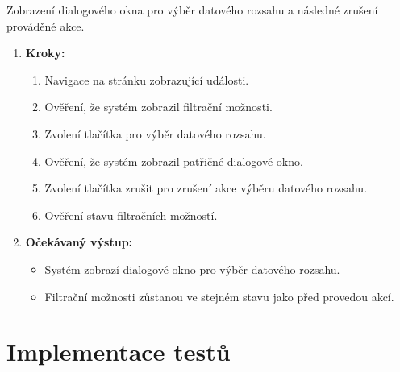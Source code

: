 Zobrazení dialogového okna pro výběr datového rozsahu a následné zrušení prováděné akce.

\begin{enumerate}
  \item \textbf{Kroky:}
    \begin{enumerate}
      \item Navigace na stránku zobrazující události.
      \item Ověření, že systém zobrazil filtrační možnosti.
      \item Zvolení tlačítka pro výběr datového rozsahu.
      \item Ověření, že systém zobrazil patřičné dialogové okno. 
      \item Zvolení tlačítka zrušit pro zrušení akce výběru datového rozsahu.
      \item Ověření stavu filtračních možností.
    \end{enumerate}
  \item \textbf{Očekávaný výstup:}
    \begin{itemize}
      \item Systém zobrazí dialogové okno pro výběr datového rozsahu.
      \item Filtrační možnosti zůstanou ve stejném stavu jako před provedou akcí.
    \end{itemize}
\end{enumerate}

\section{Implementace testů}




